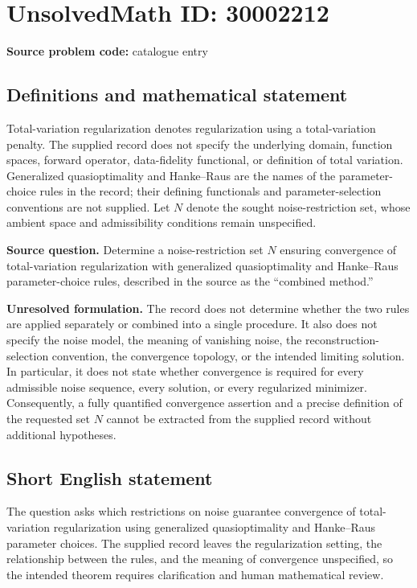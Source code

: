 \documentclass[11pt]{article}
\begin{document}
\section*{UnsolvedMath ID: 30002212}
\textbf{Source problem code:} catalogue entry
\subsection{Definitions and mathematical statement}
Total-variation regularization denotes regularization using a total-variation penalty. The supplied record does not specify the underlying domain, function spaces, forward operator, data-fidelity functional, or definition of total variation. Generalized quasioptimality and Hanke--Raus are the names of the parameter-choice rules in the record; their defining functionals and parameter-selection conventions are not supplied. Let \(N\) denote the sought noise-restriction set, whose ambient space and admissibility conditions remain unspecified.

\textbf{Source question.} Determine a noise-restriction set \(N\) ensuring convergence of total-variation regularization with generalized quasioptimality and Hanke--Raus parameter-choice rules, described in the source as the ``combined method.''

\textbf{Unresolved formulation.} The record does not determine whether the two rules are applied separately or combined into a single procedure. It also does not specify the noise model, the meaning of vanishing noise, the reconstruction-selection convention, the convergence topology, or the intended limiting solution. In particular, it does not state whether convergence is required for every admissible noise sequence, every solution, or every regularized minimizer. Consequently, a fully quantified convergence assertion and a precise definition of the requested set \(N\) cannot be extracted from the supplied record without additional hypotheses.
\subsection{Short English statement}
The question asks which restrictions on noise guarantee convergence of total-variation regularization using generalized quasioptimality and Hanke--Raus parameter choices. The supplied record leaves the regularization setting, the relationship between the rules, and the meaning of convergence unspecified, so the intended theorem requires clarification and human mathematical review.
\end{document}
